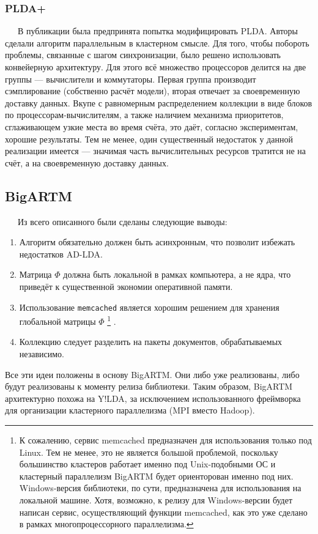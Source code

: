 \subsubsection{PLDA+}
$\quad\;\:$В публикации \cite{plda_plus} была предпринята попытка модифицировать PLDA. Авторы сделали алгоритм параллельным в кластерном смысле. Для того, чтобы побороть проблемы, связанные с шагом синхронизации, было решено использовать конвейерную архитектуру. Для этого всё множество процессоров делится на две группы --- вычислители и коммутаторы. Первая группа производит сэмплирование (собственно расчёт модели), вторая отвечает за своевременную доставку данных. Вкупе с равномерным распределением коллекции в виде блоков по процессорам-вычислителям, а также наличием механизма приоритетов, сглаживающем узкие места во время счёта, это даёт, согласно экспериментам, хорошие результаты. Тем не менее, один существенный недостаток у данной реализации имеется --- значимая часть вычислительных ресурсов тратится не на счёт, а на своевременную доставку данных.

\subsection{BigARTM}
$\quad\;\:$Из всего описанного были сделаны следующие выводы:

\begin{enumerate}
	\item Алгоритм обязательно должен быть асинхронным, что позволит избежать недостатков AD-LDA.
	\item Матрица $\Phi$ должна быть локальной в рамках компьютера, а не ядра, что приведёт к существенной экономии оперативной памяти.
	\item Использование \verb|memcached| является хорошим решением для хранения глобальной матрицы $\Phi$
	\footnote{К сожалению, сервис memcached предназначен для использования только под Linux. Тем не менее, это не является большой проблемой, поскольку большинство кластеров работает именно под Unix-подобными ОС и кластерный параллелизм BigARTM будет ориенторован именно под них. Windows-версия библиотеки, по сути, предназначена для использования на локальной машине. Хотя, возможно, к релизу для Windows-версии будет написан сервис, осуществляющий функции memcached, как это уже сделано в рамках многопроцессорного параллелизма.}
	.
	\item Коллекцию следует разделить на пакеты документов, обрабатываемых независимо.
\end{enumerate}

Все эти идеи положены в основу BigARTM. Они либо уже реализованы, либо будут реализованы к моменту релиза библиотеки.
Таким образом, BigARTM архитектурно похожа на Y!LDA, за исключением использованного фреймворка для организации кластерного параллелизма (MPI вместо Hadoop).